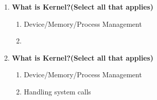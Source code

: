\begin{flushleft}
	\begin{enumerate}
	\item \textbf{What is Kernel?(Select all that applies)}
		\begin{enumerate}[label=(\alph*)]
			\item Device/Memory/Process Management
			\item {}
		\end{enumerate}
		\bigskip
		\bigskip
	\item \textbf{What is Kernel?(Select all that applies)}
		\begin{enumerate}[label=(\alph*)]
			\item Device/Memory/Process Management
			\item Handling system calls
		\end{enumerate}
		\bigskip
	\end{enumerate}
\end{flushleft}

\newpage